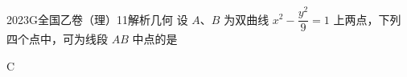 
\begin{problem}{2023}{G}{全国乙卷（理）}{11}{解析几何}
设 $ A $、$ B $ 为双曲线 $ x^2 - \dfrac{y^2}{9} = 1 $ 上两点，下列四个点中，可为线段 $ AB $ 中点的是
\begin{choices}
\end{choices}
\end{problem}

\begin{answer}
C
\end{answer}

\begin{solutions}

\end{solutions}